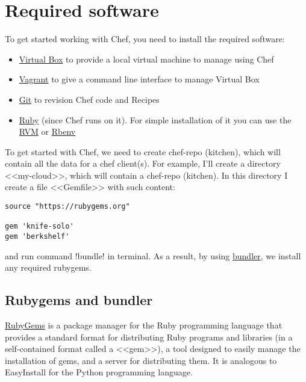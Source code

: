 \section{Required software}
\label{sec:solo-required}

To get started working with Chef, you need to install the required software:

\begin{itemize}
  \item \href{https://www.virtualbox.org/}{Virtual Box} to provide a local virtual machine to manage using Chef
  \item \href{http://www.vagrantup.com/}{Vagrant} to give a command line interface to manage Virtual Box
  \item \href{http://git-scm.com/}{Git} to revision Chef code and Recipes
  \item \href{https://www.ruby-lang.org}{Ruby} (since Chef runs on it). For simple installation of it you can use the \href{https://rvm.io/}{RVM} or \href{https://github.com/sstephenson/rbenv}{Rbenv}
\end{itemize}

To get started with Chef, we need to create chef-repo (kitchen), which will contain all the data for a chef client(s). For example, I'll create a directory <<my-cloud>>, which will contain a chef-repo (kitchen). In this directory I create a file <<Gemfile>> with such content:

\begin{lstlisting}[label=lst:my-cloud-required1,title=my-cloud/Gemfile]
source "https://rubygems.org"

gem 'knife-solo'
gem 'berkshelf'
\end{lstlisting}

and run command \inline!bundle! in terminal. As a result, by using \href{http://bundler.io/}{bundler}, we install any required rubygems.

\subsection{Rubygems and bundler}

\href{http://rubygems.org/}{RubyGems} is a package manager for the Ruby programming language that provides a standard format for distributing Ruby programs and libraries (in a self-contained format called a <<gem>>), a tool designed to easily manage the installation of gems, and a server for distributing them. It is analogous to EasyInstall for the Python programming language.

